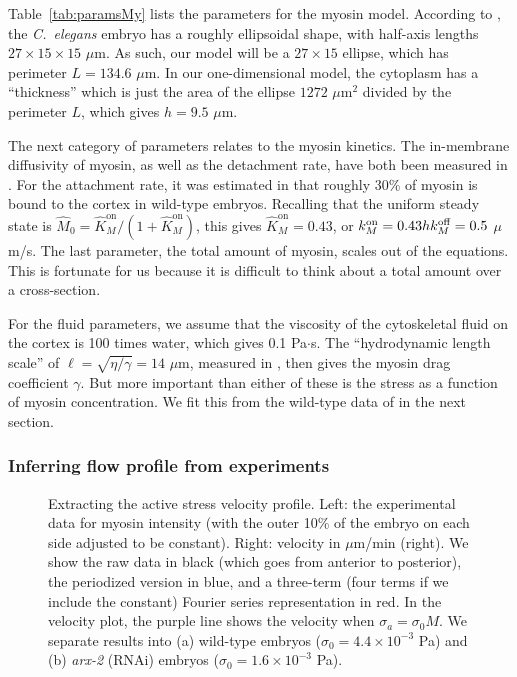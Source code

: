 \documentclass[11pt]{article}
\newcommand{\6}[1]{#1_{\text{6}}}
\newcommand{\3}[1]{#1_{\text{3}}}
\begin{document}
Table\ \ref{tab:paramsMy} lists the parameters for the myosin model. According to \cite{goehring2011polarization}, the \emph{C.\ elegans} embryo has a roughly ellipsoidal shape, with half-axis lengths $27 \times 15 \times 15$ $\mu$m. As such, our model will be a $27 \times 15$ ellipse, which has perimeter $L=134.6$ $\mu$m. In our one-dimensional model, the cytoplasm has a ``thickness'' which is just the area of the ellipse $1272$ $\mu$m$^2$ divided by the perimeter $L$, which gives $h=9.5$ $\mu$m.

The next category of parameters relates to the myosin kinetics. The in-membrane diffusivity of myosin, as well as the detachment rate, have both been measured in \cite{gross2019guiding}. For the attachment rate, it was estimated in \cite[Fig.~S3m]{gross2019guiding} that roughly 30\% of myosin is bound to the cortex in wild-type embryos. Recalling that the uniform steady state is $\hat M_0=\hat{K}^\text{on}_M/\left(1+\hat{K}^\text{on}_M\right)$, this gives $\hat{K}^\text{on}_M=0.43$, or $k^\text{on}_M = 0.43hk^\text{off}_M=0.5$ $\mu$m/s. The last parameter, the total amount of myosin, scales out of the equations. This is fortunate for us because it is difficult to think about a total amount over a cross-section. 

For the fluid parameters, we assume that the viscosity of the cytoskeletal fluid on the cortex is 100 times water, which gives 0.1 Pa$\cdot$s. The ``hydrodynamic length scale'' of $\ell=\sqrt{\eta/\gamma}=14$ $\mu$m, measured in \cite{mayer2010anisotropies, saha2016determining}, then gives the myosin drag coefficient $\gamma$. But more important than either of these is the stress as a function of myosin concentration. We fit this from the wild-type data of \cite{sailer2015dynamic} in the next section.

\subsubsection{Inferring flow profile from experiments \label{sec:MyVelFit}}
\begin{figure}
\centering
{}
\caption{\label{fig:VelProf} Extracting the active stress velocity profile. Left: the experimental data for myosin intensity (with the outer 10\% of the embryo on each side adjusted to be constant). Right: velocity in $\mu$m/min (right). We show the raw data in black (which goes from anterior to posterior), the periodized version in blue, and a three-term (four terms if we include the constant) Fourier series representation in red. In the velocity plot, the purple line shows the velocity when $\sigma_a = \sigma_0 M$. We separate results into (a) wild-type embryos ($\sigma_0 = 4.4 \times 10^{-3}$ Pa) and (b) \emph{arx-2} (RNAi) embryos ($\sigma_0=1.6 \times 10^{-3}$ Pa). }
\end{figure}
\end{document}
